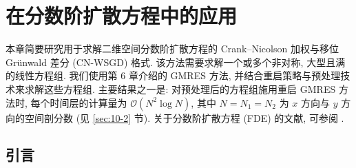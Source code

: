 \chapter{在分数阶扩散方程中的应用}
\label{ch:fde}

本章简要研究用于求解二维空间分数阶扩散方程的 Crank--Nicolson 加权与移位 Grünwald 差分 (CN-WSGD) 格式. 该方法需要求解一个或多个非对称, 大型且满的线性方程组. 我们使用第 6 章介绍的 GMRES 方法, 并结合重启策略与预处理技术来求解这些方程组. 主要结果之一是: 对预处理后的方程组施用重启 GMRES 方法时, 每个时间层的计算量为 $\mathcal{O}(N^{2}\log N)$, 其中 $N=N_{1}=N_{2}$ 为 $x$ 方向与 $y$ 方向的空间剖分数 (见 \ref{sec:10-2} 节). 关于分数阶扩散方程 (FDE) 的文献, 可参阅 \cite{src:7,src:31,src:56,src:60,src:68}.

\section{引言}
\label{sec:10-1}

